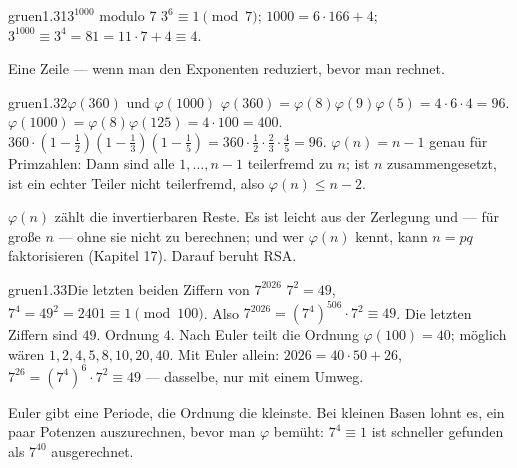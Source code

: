 \begin{loesungkarte}{gruen}{1.31}{$3^{1000}$ modulo 7}
$3^{6}\equiv1\pmod7$; $1000 = 6\cdot166 + 4$; $3^{1000}\equiv3^{4} = 81 = 11\cdot7 + 4\equiv4$.
\begin{mitnehmen}\kastentext
Eine Zeile --- wenn man den Exponenten reduziert, bevor man rechnet.
\end{mitnehmen}
\end{loesungkarte}

\begin{loesungkarte}{gruen}{1.32}{$\varphi(360)$ und $\varphi(1000)$}
$\varphi(360) = \varphi(8)\varphi(9)\varphi(5) = 4\cdot6\cdot4 = 96$. $\varphi(1000) = \varphi(8)\varphi(125) = 4\cdot100 = 400$.
$360\cdot(1 - \tfrac12)(1 - \tfrac13)(1 - \tfrac15) = 360\cdot\tfrac12\cdot\tfrac23\cdot\tfrac45 = 96$. \checkmark
{}
$\varphi(n) = n - 1$ genau für Primzahlen: Dann sind alle $1, \dots, n - 1$ teilerfremd zu $n$; ist $n$ zusammengesetzt, ist ein echter Teiler nicht teilerfremd, also $\varphi(n)\le n - 2$.
\begin{mitnehmen}\kastentext
$\varphi(n)$ zählt die invertierbaren Reste. Es ist leicht aus der Zerlegung und --- für große $n$ --- ohne sie nicht zu berechnen; und wer $\varphi(n)$ kennt, kann $n = pq$ faktorisieren (Kapitel 17). Darauf beruht RSA.
\end{mitnehmen}
\end{loesungkarte}

\begin{loesungkarte}{gruen}{1.33}{Die letzten beiden Ziffern von $7^{2026}$}
$7^{2} = 49$, $7^{4} = 49^{2} = 2401\equiv1\pmod{100}$. Also $7^{2026} = (7^{4})^{506}\cdot7^{2}\equiv49$. Die letzten Ziffern sind $49$.
Ordnung $4$. Nach Euler teilt die Ordnung $\varphi(100) = 40$; möglich wären $1, 2, 4, 5, 8, 10, 20, 40$. Mit Euler allein: $2026 = 40\cdot50 + 26$, $7^{26} = (7^{4})^{6}\cdot7^{2}\equiv49$ --- dasselbe, nur mit einem Umweg.
\begin{mitnehmen}\kastentext
Euler gibt eine Periode, die Ordnung die kleinste. Bei kleinen Basen lohnt es, ein paar Potenzen auszurechnen, bevor man $\varphi$ bemüht: $7^{4}\equiv1$ ist schneller gefunden als $7^{40}$ ausgerechnet.
\end{mitnehmen}
\end{loesungkarte}

